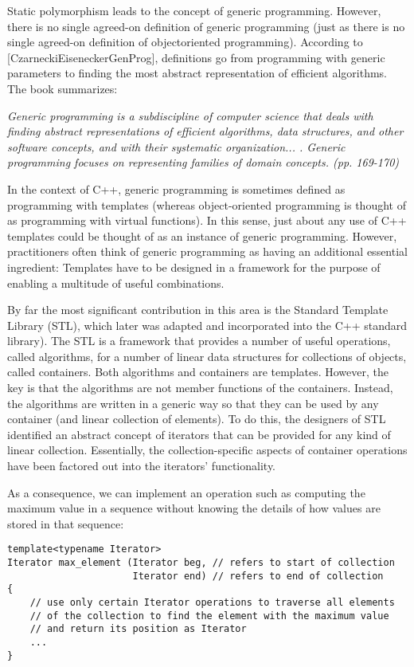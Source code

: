 Static polymorphism leads to the concept of generic programming. However, there is no single agreed-on definition of generic programming (just as there is no single agreed-on definition of objectoriented programming). According to [CzarneckiEiseneckerGenProg], definitions go from programming with generic parameters to finding the most abstract representation of efficient algorithms. The book summarizes:

\textit{Generic programming is a subdiscipline of computer science that deals with finding abstract representations of efficient algorithms, data structures, and other software concepts, and with their systematic organization... . Generic programming focuses on representing families of domain concepts. (pp. 169-170)}

In the context of C++, generic programming is sometimes defined as programming with templates (whereas object-oriented programming is thought of as programming with virtual functions). In this sense, just about any use of C++ templates could be thought of as an instance of generic programming. However, practitioners often think of generic programming as having an additional essential ingredient: Templates have to be designed in a framework for the purpose of enabling a multitude of useful combinations.

By far the most significant contribution in this area is the Standard Template Library (STL), which later was adapted and incorporated into the C++ standard library). The STL is a framework that provides a number of useful operations, called algorithms, for a number of linear data structures for collections of objects, called containers. Both algorithms and containers are templates. However, the key is that the algorithms are not member functions of the containers. Instead, the algorithms are written in a generic way so that they can be used by any container (and linear collection of elements). To do this, the designers of STL identified an abstract concept of iterators that can be provided for any kind of linear collection. Essentially, the collection-specific aspects of container operations have been factored out into the iterators’ functionality.

As a consequence, we can implement an operation such as computing the maximum value in a sequence without knowing the details of how values are stored in that sequence:

\begin{lstlisting}[style=styleCXX]
template<typename Iterator>
Iterator max_element (Iterator beg, // refers to start of collection
					  Iterator end) // refers to end of collection
{
	// use only certain Iterator operations to traverse all elements
	// of the collection to find the element with the maximum value
	// and return its position as Iterator
	...
}
\end{lstlisting}

